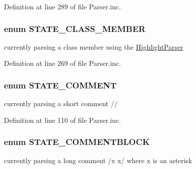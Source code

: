 \-Definition at line 289 of file \-Parser.\-inc.

\hypertarget{_parser_8inc_ae419d5a33ab271db14415977977cef73}{
\subsubsection[{\-S\-T\-A\-T\-E\-\_\-\-C\-L\-A\-S\-S\-\_\-\-M\-E\-M\-B\-E\-R}]{\setlength{\rightskip}{0pt plus 5cm}enum {\bf \-S\-T\-A\-T\-E\-\_\-\-C\-L\-A\-S\-S\-\_\-\-M\-E\-M\-B\-E\-R}}}\label{_parser_8inc_ae419d5a33ab271db14415977977cef73}
currently parsing a class member using the \hyperlink{}{\-Highlight\-Parser} 

\-Definition at line 269 of file \-Parser.\-inc.

\hypertarget{_parser_8inc_a2785dd6343120125c702582dccf41883}{
\subsubsection[{\-S\-T\-A\-T\-E\-\_\-\-C\-O\-M\-M\-E\-N\-T}]{\setlength{\rightskip}{0pt plus 5cm}enum {\bf \-S\-T\-A\-T\-E\-\_\-\-C\-O\-M\-M\-E\-N\-T}}}\label{_parser_8inc_a2785dd6343120125c702582dccf41883}
currently parsing a short comment // 

\-Definition at line 110 of file \-Parser.\-inc.

\hypertarget{_parser_8inc_a826c4b63e70b32d63c5cae29753a3fae}{
\subsubsection[{\-S\-T\-A\-T\-E\-\_\-\-C\-O\-M\-M\-E\-N\-T\-B\-L\-O\-C\-K}]{\setlength{\rightskip}{0pt plus 5cm}enum {\bf \-S\-T\-A\-T\-E\-\_\-\-C\-O\-M\-M\-E\-N\-T\-B\-L\-O\-C\-K}}}\label{_parser_8inc_a826c4b63e70b32d63c5cae29753a3fae}
currently parsing a long comment /x x/ where x is an asterisk 

